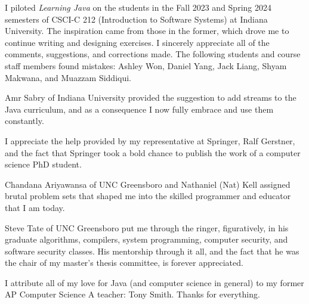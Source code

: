 %
%


I piloted \emph{Learning Java} on the students in the Fall 2023 and Spring 2024 semesters of CSCI-C 212 (Introduction to Software Systems) at Indiana University. The inspiration came from those in the former, which drove me to continue writing and designing exercises. I sincerely appreciate all of the comments, suggestions, and corrections made. The following students and course staff members found mistakes: Ashley Won, Daniel Yang, Jack Liang, Shyam Makwana, and Muazzam Siddiqui.

Amr Sabry of Indiana University provided the suggestion to add streams to the Java curriculum, and as a consequence I now fully embrace and use them constantly.

I appreciate the help provided by my representative at Springer, Ralf Gerstner, and the fact that Springer took a bold chance to publish the work of a computer science PhD student.

Chandana Ariyawansa of UNC Greensboro and Nathaniel (Nat) Kell assigned brutal problem sets that shaped me into the skilled programmer and educator that I am today. 

Steve Tate of UNC Greensboro put me through the ringer, figuratively, in his graduate algorithms, compilers, system programming, computer security, and software security classes. His mentorship through it all, and the fact that he was the chair of my master's thesis committee, is forever appreciated.

I attribute all of my love for Java (and computer science in general) to my former AP Computer Science A teacher: Tony Smith. Thanks for everything.
